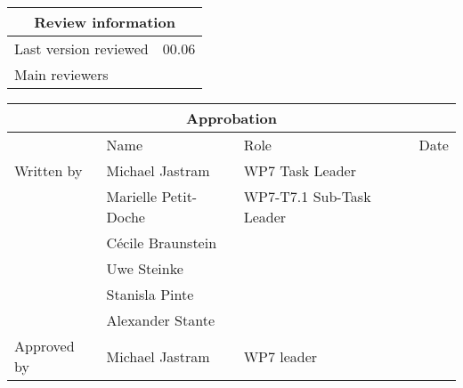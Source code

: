 \documentclass{template/openetcs_report}
\begin{document}
\begin{tabular}{|p{4.4cm}|p{8.7cm}|}
\hline
\multicolumn{2}{|c|}{Review information} \\
\hline
Last version reviewed & 00.06 \\
\hline
Main reviewers &  \\
\hline
\end{tabular}

\begin{tabular}{|p{2.2cm}|p{4cm}|p{4cm}|p{2cm}|}
\hline
\multicolumn{4}{|c|}{Approbation} \\
\hline
  &  Name & Role & Date   \\
\hline  
Written by  & Michael Jastram & WP7 Task Leader  &  \\
&  Marielle Petit-Doche & WP7-T7.1 Sub-Task Leader  & \\
& Cécile Braunstein & &  \\
& Uwe Steinke & &  \\
& Stanisla Pinte & &  \\
& Alexander Stante & &  \\
\hline
Approved by & Michael Jastram & WP7 leader & \\
\hline
\end{tabular}
\end{document}
